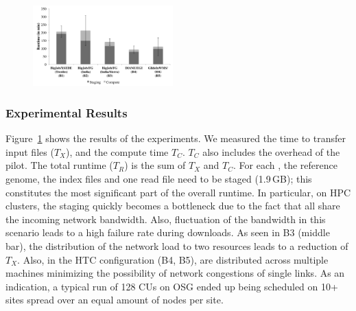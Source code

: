 \documentclass[conference]{IEEEtran}
\begin{document}


\begin{figure}[t]
 \up
 \centering
 \includegraphics[width=0.48\textwidth]{../perf/interop/128-bfast-egi-fg-xsede-osg-with-staging.pdf}
 \caption{\up\up}
\label{fig:perf_perf-bfast-bj}
\end{figure}


\subsubsection*{Experimental Results}


Figure~\ref{fig:perf_perf-bfast-bj} shows the results of the
experiments. We measured the time to transfer input files ($T_X$), and
the compute time $T_C$. $T_C$ also includes the overhead of the pilot.
The total runtime ($T_R$) is the sum of $T_X$ and $T_C$.  For each
\cu, the reference genome, the index files and one read file need to
be staged (1.9\,GB); this constitutes the most significant part of the
overall runtime. In particular, on HPC clusters, the staging quickly
becomes a bottleneck due to the fact that all \cus share the incoming
network bandwidth.  Also, fluctuation of the bandwidth in this
scenario leads to a high failure rate during downloads. As seen in B3
(middle bar), the distribution of the network load to two resources
leads to a reduction of $T_{X}$. Also, in the HTC configuration (B4,
B5), \cus are distributed across multiple machines minimizing the
possibility of network congestions of single links. As an indication,
a typical run of 128 CUs on OSG ended up being scheduled on 10+ sites
spread over an equal amount of nodes per site.
\end{document}
